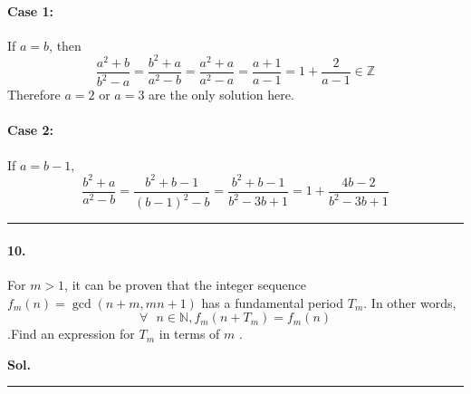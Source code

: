\documentclass[12pt]{amsart}
\begin{document}
\paragraph*{\textbf{Case 1:}} If $a=b$, then 
$$\frac{a^2+b}{b^2-a} =\frac{b^2+a}{a^2-b} = \frac{a^2+a}{a^2-a} = \frac{a+1}{a-1} = 1+ \frac{2}{a-1} \in \mathbb{Z}$$
Therefore $a=2$ or $a=3$ are the only solution here.

\paragraph*{\textbf{Case 2:}} If $a=b-1$,
$$\frac{b^2+a}{a^2-b} = \frac{b^2+b-1}{(b-1)^2-b}=\frac{b^2+b-1}{b^2-3b+1}=1+ \frac{4b-2}{b^2-3b+1}$$


\par\noindent\textcolor{gray}{\rule{\textwidth}{0.5pt}}
\smallskip

\paragraph*{10.} For $ m>1 $, it can be proven that the integer sequence $f_m(n) = \gcd{(n+m, mn+ 1)} $ has a fundamental period $ T_m $.  In other words,$$ \forall \text{ } n \in \mathbb{N} ,  f_m(n+T_m) =f_m(n) $$.Find an expression for $T_m$ in terms of $ m $ .

\bigskip
\textbf{Sol.}



\par\noindent\textcolor{gray}{\rule{\textwidth}{0.5pt}}
\smallskip
\end{document}

